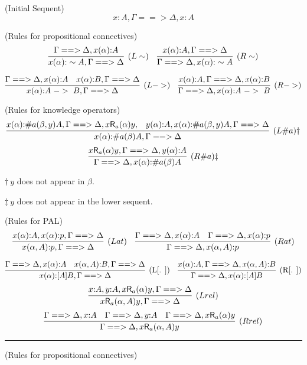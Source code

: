\documentclass[b4paper,landscape]{article}
\begin{document}
\begin{table}[t]
\caption{G3PAL'}
\label{tb:table2}
\noindent (Initial Sequent)
\[
  x{:} A, \Gamma ==> \Delta, x{:} A
\]

\noindent (Rules for propositional connectives)
\[
  \infer[(L\sim )]{
    x(\alpha){:} \sim A,\Gamma ==> \Delta
  }{
    \Gamma ==> \Delta,x(\alpha){:} A
  }
\quad
  \infer[(R\sim)]{
    \Gamma ==> \Delta,x(\alpha){:} \sim A
  }{
    x(\alpha){:} A,\Gamma ==> \Delta
  }
\]

\[
  \infer[(L->)]{
    x(\alpha){:} A\ ->\ B,\Gamma ==> \Delta
  }{
    \Gamma ==> \Delta,x(\alpha){:} A
    &
    x(\alpha){:} B,\Gamma ==> \Delta
  }
\quad
  \infer[(R->)]{
    \Gamma ==> \Delta,x(\alpha){:} A\ ->\ B
  }{
    x(\alpha){:} A,\Gamma ==> \Delta, x(\alpha){:} B
  }
\]

\noindent (Rules for knowledge operators)
\[
  \infer[(L\#a)$\dag$]{
    x(\alpha){:} \#a(\beta)A,\Gamma ==> \Delta
  }{
     x(\alpha){:} \#a(\beta,y)A,\Gamma ==> \Delta,x\mathsf{R}_a(\alpha)y,
    &
    y(\alpha){:} A,   x(\alpha){:} \#a(\beta,y)A,\Gamma ==> \Delta
  }
\]
\[  \infer[(R\#a)$\ddag$]{
    \Gamma ==> \Delta,x(\alpha){:} \#a(\beta)A
  }{
    x\mathsf{R}_a(\alpha)y,\Gamma ==> \Delta,y(\alpha){:} A
  }
\]
\begin{center}
 $\dag\ y$ does not appear in $\beta$. 

 $\ddag\ y$ does not appear in the lower sequent. 
\end{center}

\noindent (Rules for PAL)
\[
  \infer[(Lat)]{
    x(\alpha,A){:} p,\Gamma ==> \Delta
  }{
    x(\alpha){:} A ,x(\alpha){:} p ,\Gamma ==> \Delta
  }
\quad
  \infer[(Rat)]{
    \Gamma ==> \Delta,x(\alpha,A){:} p
  }{
    \Gamma ==> \Delta,x(\alpha){:} A
    &
    \Gamma ==> \Delta,x(\alpha){:} p
  }
\]

\[
  \infer[\mbox{(L[. ])}]{
    x(\alpha){:} [A]B,\Gamma ==> \Delta
  }{
    \Gamma ==> \Delta,x(\alpha){:} A
    &
    x(\alpha,A){:} B,\Gamma ==> \Delta
  }
\quad
  \infer[\mbox{(R[. ])}]{
    \Gamma ==> \Delta,x(\alpha){:} [A]B
  }{
    x(\alpha){:} A,\Gamma ==> \Delta,x(\alpha,A){:} B
  }
\]
\[
  \infer[(Lrel)]{
    x\mathsf{R}_a(\alpha,A)y,\Gamma ==> \Delta
  }{
    x{:}A,y{:}A,x\mathsf{R}_a(\alpha)y,\Gamma ==> \Delta
  }
\]
\[
  \infer[(Rrel)]{
    \Gamma ==> \Delta,x\mathsf{R}_a(\alpha,A)y
  }{
    \Gamma ==> \Delta,x{:}A
    &
    \Gamma ==> \Delta,y{:}A
    &
    \Gamma ==> \Delta,x\mathsf{R}_a(\alpha)y
  }
\]
\hrule
\noindent (Rules for propositional connectives)


\end{table}
\end{document}
